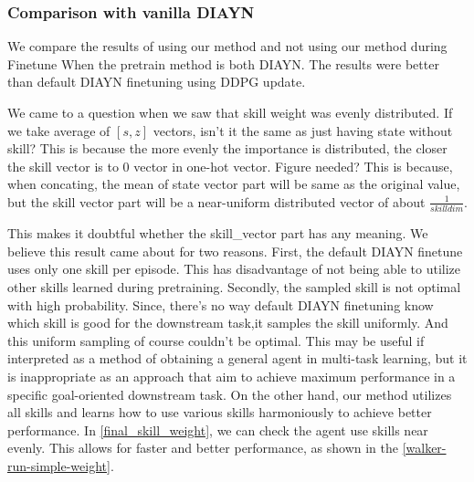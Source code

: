\subsubsection{Comparison with vanilla DIAYN}
We compare the results of using our method and not using our method during Finetune When the pretrain method is both DIAYN.
The results were better than default DIAYN finetuning using DDPG update.

We came to a question when we saw that skill weight was evenly distributed.
If we take average of ${[s,z]}$ vectors, isn't it the same as just having state without skill?
This is because the more evenly the importance is distributed, the closer the skill vector is to 0 vector in one-hot vector. Figure needed?
This is because, when concating, the mean of state vector part will be same as the original value,
but the skill vector part will be a near-uniform distributed vector of about $\frac{1}{skilldim}$.

This makes it doubtful whether the skill_vector part has any meaning.
We believe this result came about for two reasons.
First, the default DIAYN finetune uses only one skill per episode.
This has disadvantage of not being able to utilize other skills learned during pretraining.
Secondly, the sampled skill is not optimal with high probability.
Since, there's no way default DIAYN finetuning know which skill is good for the downstream task,it samples the skill uniformly.
And this uniform sampling of course couldn't be optimal.
This may be useful if interpreted as a method of obtaining a general agent in multi-task learning,
but it is inappropriate as an approach that aim to achieve maximum performance in a specific goal-oriented downstream task.
On the other hand, our method utilizes all skills and learns how to use various skills harmoniously to achieve better performance.
In \cref*{final_skill_weight}, we can check the agent use skills near evenly.
This allows for faster and better performance, as shown in the \cref{walker-run-simple-weight}.

